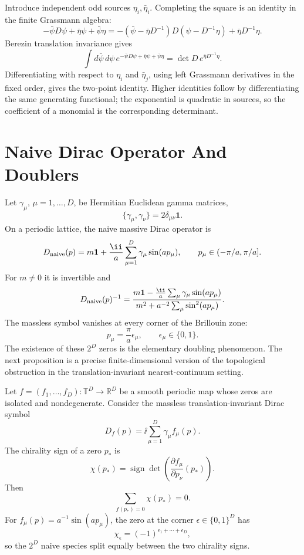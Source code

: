 Introduce independent odd sources \(\eta_i,\bar\eta_i\).  Completing the
square is an identity in the finite Grassmann algebra:
\[
  -\bar\psi D\psi+\bar\eta\psi+\bar\psi\eta
  =
  -(\bar\psi-\bar\eta D^{-1})D(\psi-D^{-1}\eta)
  +
  \bar\eta D^{-1}\eta .
\]
Berezin translation invariance gives
\[
  \int d\bar\psi\,d\psi\,
  e^{-\bar\psi D\psi+\bar\eta\psi+\bar\psi\eta}
  =
  \det D\,
  e^{\bar\eta D^{-1}\eta}.
\]
Differentiating with respect to \(\eta_i\) and \(\bar\eta_j\), using left
Grassmann derivatives in the fixed order, gives the two-point identity.
Higher identities follow by differentiating the same generating functional;
the exponential is quadratic in sources, so the coefficient of a monomial is
the corresponding determinant.

\section{Naive Dirac Operator And Doublers}

Let \(\gamma_\mu\), \(\mu=1,\ldots,D\), be Hermitian Euclidean gamma matrices,
\[
  \{\gamma_\mu,\gamma_\nu\}=2\delta_{\mu\nu}\mathbf 1 .
\]
On a periodic lattice, the naive massive Dirac operator is
\[
  D_{\rm naive}(p)
  =
  m\mathbf 1+\frac{\ii}{a}\sum_{\mu=1}^D\gamma_\mu\sin(ap_\mu),
  \qquad
  p_\mu\in(-\pi/a,\pi/a].
\]
For \(m\neq0\) it is invertible and
\begin{equation}
  D_{\rm naive}(p)^{-1}
  =
  \frac{
    m\mathbf 1-\frac{\ii}{a}\sum_\mu\gamma_\mu\sin(ap_\mu)}
  {m^2+a^{-2}\sum_\mu\sin^2(ap_\mu)} .
  \label{eq:lattice-naive-propagator-symbol}
\end{equation}
The massless symbol vanishes at every corner of the Brillouin zone:
\[
  p_\mu=\frac{\pi}{a}\epsilon_\mu,\qquad
  \epsilon_\mu\in\{0,1\}.
\]
The existence of these \(2^D\) zeros is the elementary doubling phenomenon.
The next proposition is a precise finite-dimensional version of the
topological obstruction in the translation-invariant nearest-continuum
setting.

\begin{proposition}
\label{prop:lattice-fermion-brillouin-index-cancellation}
Let \(f=(f_1,\ldots,f_D):\mathbb T^D\to\mathbb R^D\) be a smooth periodic
map whose zeros are isolated and nondegenerate.  Consider the massless
translation-invariant Dirac symbol
\[
  D_f(p)=\ii\sum_{\mu=1}^D\gamma_\mu f_\mu(p).
\]
The chirality sign of a zero \(p_*\) is
\[
  \chi(p_*)=\operatorname{sign}\det
  \left(\frac{\partial f_\mu}{\partial p_\nu}(p_*)\right).
\]
Then
\[
  \sum_{f(p_*)=0}\chi(p_*)=0 .
\]
For \(f_\mu(p)=a^{-1}\sin(ap_\mu)\), the zero at the corner
\(\epsilon\in\{0,1\}^D\) has
\[
  \chi_\epsilon=(-1)^{\epsilon_1+\cdots+\epsilon_D},
\]
so the \(2^D\) naive species split equally between the two chirality signs.
\end{proposition}

